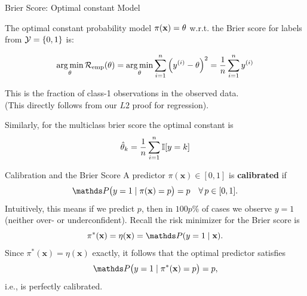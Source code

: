 \documentclass[11pt,compress,t,notes=noshow, xcolor=table]{beamer}
\begin{document}
\begin{vbframe}{Brier Score: Optimal constant Model}

The optimal constant probability model $\pi(\mathbf{x}) = \theta$ w.r.t. the Brier score for labels from $\mathcal{Y} = \{0, 1\}$ is:

\vspace*{-0.2cm}

\begin{equation*}
  \mathop{\mathrm{arg\,min}}_{\theta} \mathcal{R}_{\text{emp}}(\theta) = \mathop{\mathrm{arg\,min}}_{\theta} \sum\limits_{i=1}^n \left(y^{(i)} - \theta\right)^2 = \frac{1}{n} \sum\limits_{i=1}^n y^{(i)}
\end{equation*}

This is the fraction of class-1 observations in the observed data.\\
(This directly follows from our $L2$ proof for regression).

\vspace*{0.2cm}

Similarly, for the multiclass brier score the optimal constant is $$\hat{\theta}_k = \frac{1}{n}\sum\limits_{i=1}^n \mathbb{I} [y = k]$$ 

\end{vbframe}

\begin{vbframe}{Calibration and the Brier Score}
A predictor \(\pi(\mathbf{x})\in[0,1]\) is \textbf{calibrated} if 
\[
\P\bigl(y=1 \mid \pi(\mathbf{x})=p\bigr)=p \quad \forall\, p\in[0,1].
\]
Intuitively, this means if we predict $p$, then in $100p\%$ of cases we observe $y=1$ (neither over- or underconfident). Recall the risk minimizer for the Brier score is
\[
\pi^*(\mathbf{x}) = \eta(\mathbf{x}) = \P(y=1 \mid \mathbf{x}).
\]
Since \(\pi^*(\mathbf{x})=\eta(\mathbf{x})\) exactly, it follows that the optimal predictor satisfies
\[
\P\bigl(y=1 \mid \pi^*(\mathbf{x})=p\bigr)=p,
\]
i.e., is perfectly calibrated.
\end{vbframe}
\end{document}
